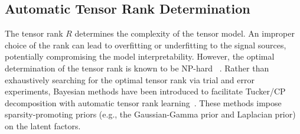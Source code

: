 

\subsection{ Automatic Tensor Rank Determination}
The tensor rank $R$ 
determines the complexity of the tensor model. An improper choice of the rank can lead to overfitting  or underfitting to the signal sources, potentially compromising the model interpretability. However, the optimal determination of the tensor rank is known to be NP-hard ~\citep{cheng2022towards, kolda2009tensor(NPhard), haastad1989tensor_np}.
Rather than exhaustively searching for the optimal tensor rank via trial and error experiments,  Bayesian methods have been introduced to facilitate Tucker/CP decomposition with automatic tensor rank learning~\citep{morup2009automatic_ARD, zhao2015bayesianCP, cheng2022towards, pmlr-v32-rai14}. These methods impose sparsity-promoting priors (e.g., the Gaussian-Gamma prior and Laplacian prior)  on the latent factors.

